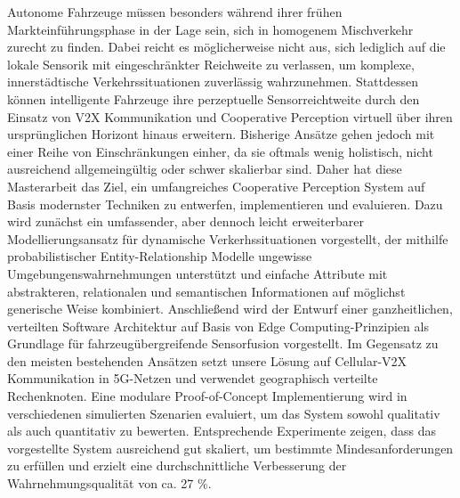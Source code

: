 Autonome Fahrzeuge müssen besonders während ihrer frühen Markteinführungsphase in der Lage sein, sich in homogenem Mischverkehr zurecht zu finden. Dabei reicht es möglicherweise nicht aus, sich lediglich auf die lokale Sensorik mit eingeschränkter Reichweite zu verlassen, um komplexe, innerstädtische Verkehrssituationen zuverlässig wahrzunehmen. Stattdessen können intelligente Fahrzeuge ihre perzeptuelle Sensorreichtweite durch den Einsatz von V2X Kommunikation und Cooperative Perception virtuell über ihren ursprünglichen Horizont hinaus erweitern. Bisherige Ansätze gehen jedoch mit einer Reihe von Einschränkungen einher, da sie oftmals wenig holistisch, nicht ausreichend allgemeingültig oder schwer skalierbar sind. Daher hat diese Masterarbeit das Ziel, ein umfangreiches Cooperative Perception System auf Basis modernster Techniken zu entwerfen, implementieren und evaluieren. Dazu wird zunächst ein umfassender, aber dennoch leicht erweiterbarer Modellierungsansatz für dynamische Verkerhssituationen vorgestellt, der mithilfe probabilistischer Entity-Relationship Modelle ungewisse Umgebungenswahrnehmungen unterstützt und einfache Attribute mit abstrakteren, relationalen und semantischen Informationen auf möglichst generische Weise kombiniert. Anschließend wird der Entwurf einer ganzheitlichen, verteilten Software Architektur auf Basis von Edge Computing-Prinzipien als Grundlage für fahrzeugübergreifende Sensorfusion vorgestellt. Im Gegensatz zu den meisten bestehenden Ansätzen setzt unsere Lösung auf Cellular-V2X Kommunikation in 5G-Netzen und verwendet geographisch verteilte Rechenknoten. Eine modulare Proof-of-Concept Implementierung wird in verschiedenen simulierten Szenarien evaluiert, um das System sowohl qualitativ als auch quantitativ zu bewerten. Entsprechende Experimente zeigen, dass das vorgestellte System ausreichend gut skaliert, um bestimmte Mindesanforderungen zu erfüllen und erzielt eine durchschnittliche Verbesserung der Wahrnehmungsqualität von ca. 27 \%. 